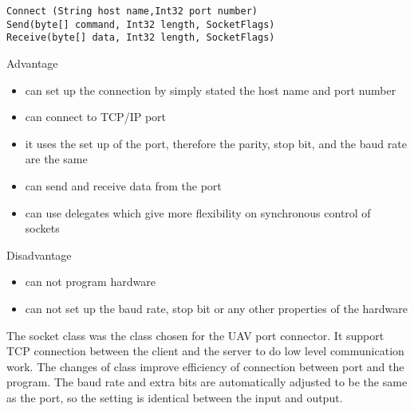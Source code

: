 \begin{lstlisting}[caption=Socket class connect receive and send method,label=socketClasscrs]
Connect (String host name,Int32 port number)
Send(byte[] command, Int32 length, SocketFlags)
Receive(byte[] data, Int32 length, SocketFlags)
\end{lstlisting}

Advantage
\begin{itemize}
\item can set up the connection by simply stated the host name and port number
\item can connect to TCP/IP port 
\item it uses the set up of the port, therefore the parity, stop bit, and the baud rate are the same
\item can send and receive data from the port
\item can use delegates which give more flexibility on synchronous control of sockets \cite{robertH}
\end{itemize}
Disadvantage
\begin{itemize}
\item can not program hardware
\item can not set up the baud rate, stop bit or any other properties of the hardware
\end{itemize}

The socket class was the class chosen for the UAV port connector. 
It support TCP connection between the client and the server to do low level communication work\cite{xieX}. 
The changes of class improve efficiency of connection between port and the program. 
The baud rate and extra bits are automatically adjusted to be the same as the port, so the setting is identical between the input and output.